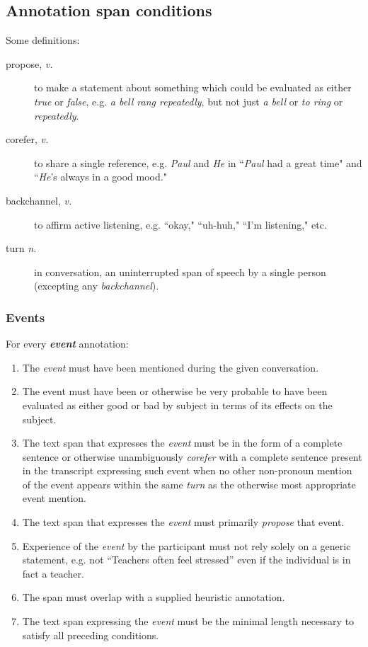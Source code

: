 \documentclass[a4paper,12pt]{article}
\begin{document}
    \subsection{Annotation span conditions} \label{conditions}
        Some definitions:
        \begin{description}
            \item[propose, \emph{v.}] to make a statement about something which could be evaluated as either \emph{true} or \emph{false},
                e.g. \emph{a bell rang repeatedly}, but not just \emph{a bell} or \emph{to ring} or \emph{repeatedly}.
            \item[corefer, \emph{v.}] to share a single reference,
                e.g. \emph{Paul} and \emph{He} in ``\emph{Paul} had a great time" and ``\emph{He}'s always in a good mood."
            \item[backchannel, \emph{v.}] to affirm active listening, e.g. ``okay," ``uh-huh," ``I'm listening," etc.
            \item[turn \emph{n.}] in conversation, an uninterrupted span of speech by a single person (excepting any \emph{backchannel}).
        \end{description}

    \subsubsection{Events}
    For every \textbf{\emph{event}} annotation:
        \begin{enumerate}
            \item The \emph{event} must have been mentioned during the given conversation.
            \item The event must have been or otherwise be very probable to have been evaluated as either good or bad by subject in terms of its effects on the subject.
            \item The text span that expresses the \emph{event} must be in the form of a complete sentence or otherwise unambiguously \emph{corefer} with a complete sentence present in the transcript expressing such event when no other non-pronoun mention of the event appears within the same \emph{turn} as the otherwise most appropriate event mention.
            \item The text span that expresses the \emph{event} must primarily \emph{propose} that event. %
            \item Experience of the \emph{event} by the participant must not rely solely on a generic statement,
                e.g. not ``Teachers often feel stressed'' even if the individual is in fact a teacher.
            \item The span must overlap with a supplied heuristic annotation.
            \item The text span expressing the \emph{event} must be the minimal length necessary to satisfy all preceding conditions.
        \end{enumerate}
\end{document}
